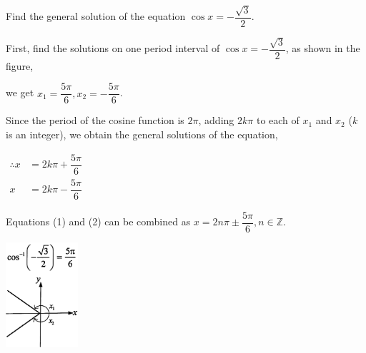 \documentclass{report}
\begin{document}
\begin{question}
	Find the general solution of the equation $\cos x=-\dfrac{\sqrt{3}}{2}$.
	
	\sol{}
	\begin{vwcol}[widths={0.6,0.4}, sep=0.8cm, justify=flush,rule=0pt]
		\noindent First, find the solutions on one period interval of $\cos x=-\dfrac{\sqrt{3}}{2}$, as shown in the figure,
		
		\noindent we get $x_1=\dfrac{5\pi}{6}, x_2=-\dfrac{5\pi}{6}$.
		
		\noindent Since the period of the cosine function is $2\pi$, adding $2k\pi$ to each of $x_1$ and $x_2$ ($k$ is an integer), we obtain the general solutions of the equation,
		        
		\vspace{1em}
		\noindent $
		\begin{aligned}
			\therefore x & =2k\pi+\dfrac{5\pi}{6} \\
			x            & =2k\pi-\dfrac{5\pi}{6} 
		\end{aligned}
		$
		
		\noindent Equations (1) and (2) can be combined as $x=2n\pi\pm\dfrac{5\pi}{6}, n \in \mathbb{Z}$.
		\vspace{2em}
		
		\includegraphics[width=0.2\textwidth]{assets/11-13.jpg}
	\end{vwcol}
	\vspace{-1em}
\end{question}
\newpage
\end{document}
